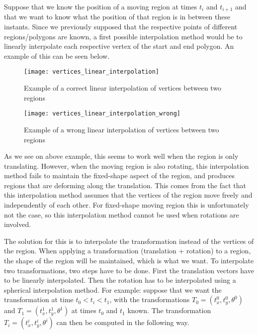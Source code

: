 		Suppose that we know the position of a moving region at times \( t_i \) and \( t_{i+1} \) and that we want to know what the position of that region is in between these instants. Since we previously supposed that the respective points of different regions/polygons are known, a first possible interpolation method would be to linearly interpolate each respective vertex of the start and end polygon. An example of this can be seen below. 
		
		
		\begin{figure}[h]
			\centering
			\texttt{[image: vertices\_linear\_interpolation]}
			\caption{Example of a correct linear interpolation of vertices between two regions}
			\label{fig:correct_vertices_interpol}
		\end{figure}
		
		\begin{figure}[h]
			\centering
			\texttt{[image: vertices\_linear\_interpolation\_wrong]}
			\caption{Example of a wrong linear interpolation of vertices between two regions}
			\label{fig:wrong_vertices_interpol}
		\end{figure}

		As we see on above example, this seems to work well when the region is only translating. However, when the moving region is also rotating, this interpolation method fails to maintain the fixed-shape aspect of the region, and produces regions that are deforming along the translation. This comes from the fact that this interpolation method assumes that the vertices of the region move freely and independently of each other. For fixed-shape moving region this is unfortunately not the case, so this interpolation method cannot be used when rotations are involved. 

		The solution for this is to interpolate the transformation instead of the vertices of the region. When applying a transformation (translation + rotation) to a region, the shape of the region will be maintained, which is what we want. To interpolate two transformations, two steps have to be done. First the translation vectors have to be linearly interpolated. Then the rotation has to be interpolated using a spherical interpolation method. For example: suppose that we want the transformation at time \( t_0 < t_i < t_1 \), with the transformations \( T_0 = (t_x^0, t_y^0, \theta^0) \) and \( T_1 = (t_x^1, t_y^1, \theta^1) \) at times \( t_0 \) and \( t_1 \) known. The transformation \( T_i = (t_x^i, t_y^i, \theta^i) \) can then be computed in the following way.

